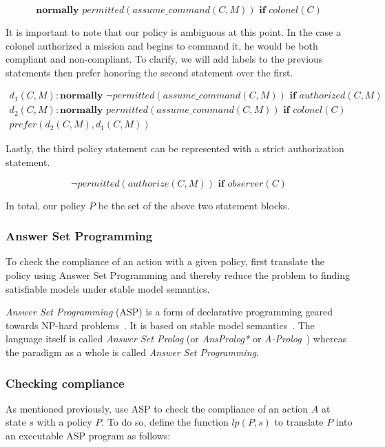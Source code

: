 \[
\textbf{normally } permitted(assume\_command(C, M)) \textbf{ if } colonel(C)
\]

It is important to note that our policy is ambiguous at this point.
In the case a colonel authorized a mission and begins to command it, he would be both compliant and non-compliant.
To clarify, we will add labels to the previous statements then prefer honoring the second statement over the first.

\begin{gather*}
    d_1(C, M): \textbf{normally } \neg permitted(assume\_command(C, M)) \textbf{ if } authorized(C, M) \\
    d_2(C, M): \textbf{normally } permitted(assume\_command(C, M)) \textbf{ if } colonel(C) \\
    prefer(d_2(C,M),d_1(C,M))
\end{gather*}

Lastly, the third policy statement can be represented with a strict authorization statement.

\[
\neg permitted(authorize(C, M)) \textbf{ if } observer(C)
\]

In total, our policy $P$ be the set of the above two statement blocks.

\subsubsection{Answer Set Programming}
\label{subsubsec:asp}

To check the compliance of an action with a given policy, \citet{gelfond_authorization_2008} first translate the policy using Answer Set Programming and thereby reduce the problem to finding satisfiable models under stable model semantics.

\textit{Answer Set Programming} (ASP) is a form of declarative programming geared towards NP-hard problems~\citep{vladimir_lifschitz_what_2008}.
It is based on stable model semantics~\citep{gelfond_stable_1988}.
The language itself is called \textit{Answer Set Prolog} (or \textit{AnsProlog*} or \textit{A-Prolog}~\citep{baral_answer_2004}) whereas the paradigm as a whole is called \textit{Answer Set Programming}.

\subsubsection{Checking compliance}

As mentioned previously, \citet{gelfond_authorization_2008} use ASP to check the compliance of an action $A$ at state $s$ with a policy $P$.
To do so, \citet{gelfond_authorization_2008} define the function $lp(P,s)$ to translate $P$ into an executable ASP program as follows:

